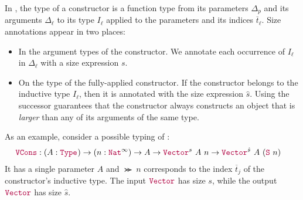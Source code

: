 In , the type of a constructor is a function type from its parameters $\Delta_p$ and its arguments $\Delta_\ell$ to its \coinductive type $I_\ell$ applied to the parameters and its indices $\overline{t}_\ell$.
Size annotations appear in two places:
\begin{itemize}
    \item In the argument types of the constructor.
      We annotate each occurrence of $I_\ell$ in $\Delta_\ell$ with a size expression $s$.
    \item On the \coinductive type of the fully-applied constructor.
      If the constructor belongs to the inductive type $I_\ell$, then it is annotated with the size expression $\hat{s}$.
      Using the successor guarantees that the constructor always constructs an object that is \textit{larger} than any of its arguments of the same type.
\end{itemize}
As an example, consider a possible typing of :
\begin{align*}
\VCons &: (A: \Type{}) \to (n:\Nat^\infty) \to A \to \Vector^s ~ A ~ n \to \Vector^{\hat{s}} ~ A ~ (\Succ ~ n)
\end{align*}
It has a single parameter $A$ and $\Succ ~ n$ corresponds to the index $\overline{t}_j$ of the constructor's inductive type.
The input $\Vector$ has size $s$, while the output $\Vector$ has size $\hat{s}$.

